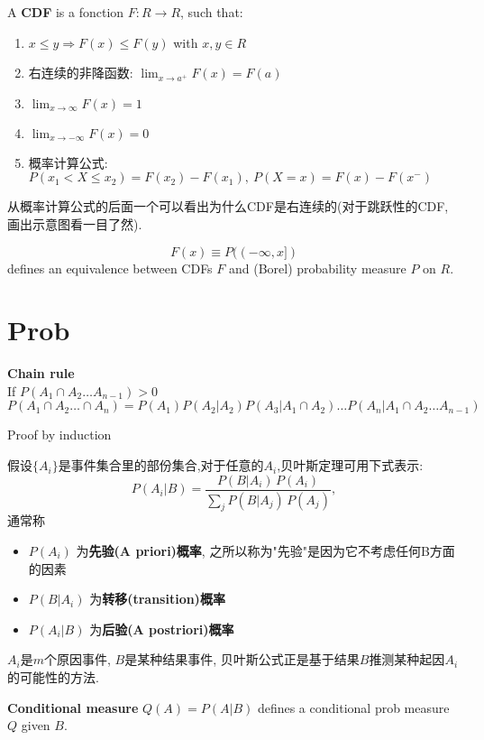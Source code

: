 \documentclass{article}
\begin{document}
\begin{definition}
A \textbf{CDF} is a fonction $F: R \rightarrow R$, such that:
\begin{enumerate}
\item $x \leq y \Rightarrow F(x) \leq F(y)$ with $x,y \in R$
\item 右连续的非降函数: $\lim_{x \to a^{+}}F(x) = F(a)$
\item $\lim_{x \to \infty}F(x) = 1$
\item $\lim_{x \to -\infty}F(x) = 0$
\item 概率计算公式: $P(x_1 < X \leq x_2) = F(x_2) - F(x_1),\ P(X=x) = F(x) - F(x^{-})$
\end{enumerate}
\end{definition}
从概率计算公式的后面一个可以看出为什么CDF是右连续的(对于跳跃性的CDF, 画出示意图看一目了然).

\begin{theorem}
$$F(x) \equiv P((-\infty, x])$$
defines an equivalence between CDFs $F$ and (Borel) probability measure $P$ on $R$.
\end{theorem}

\section{Prob}
\begin{theorem}
\textbf{Chain rule}\\
If $P(A_1 \cap A_2 \ldots A_{n-1}) > 0$
$$ P(A_1 \cap A_2 \ldots \cap A_n) = P(A_1) P(A_2 | A_2) P(A_3 | A_1 \cap A_2) \ldots P(A_n | A_1 \cap A_2 \ldots A_{n-1}) $$
\end{theorem}
Proof by induction

假设$\{A_i\}$是事件集合里的部份集合,对于任意的$A_i$,贝叶斯定理可用下式表示:
$$
P(A_i|B) = \frac{P(B | A_i)\, P(A_i)}{\sum_j P(B|A_j)\,P(A_j)} , \!
$$
通常称
\begin{itemize}
\item $P(A_i)$ 为\textbf{先验(A priori)概率}, 之所以称为"先验"是因为它不考虑任何B方面的因素
\item $P(B|A_i)$ 为\textbf{转移(transition)概率}
\item $P(A_i|B)$ 为\textbf{后验(A postriori)概率}
\end{itemize}
$A_i$是$m$个原因事件, $B$是某种结果事件, 贝叶斯公式正是基于结果$B$推测某种起因$A_i$的可能性的方法.

\begin{definition}
\textbf{Conditional measure} $Q(A) = P(A|B)$ defines a conditional prob measure $Q$ given $B$.
\end{definition}
\end{document}
